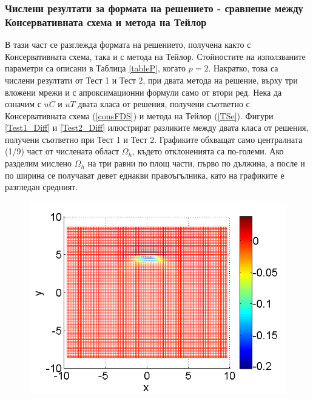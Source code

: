\documentclass[a4paper]{article}
\newcommand{\rf}[1]{(\ref{#1})}
\theoremstyle{remark}
\begin{document}
\begin{large}
\subsubsection{Числени резултати за формата на решението - сравнение между Консервативната схема и метода на Тейлор}
В тази част се разглежда формата на решението, получена както с Консервативната схема, така и с метода на Тейлор. Стойностите на използваните параметри са описани в Таблица \ref{tableP}, когато $p=2$. Накратко, това са числени резултати от Тест 1 и Тест 2, при двата метода на решение, върху три вложени мрежи и с апроксимационни формули само от втори ред. Нека да означим с $uC$ и $uT$ двата класа от решения, получени съответно с Консервативната схема \rf{consFDS} и метода на Тейлор \rf{TSe}. 
Фигури \ref{Test1_Diff} и \ref{Test2_Diff} илюстрират разликите между двата класа от решения, получени съответно при Тест 1 и Тест 2. Графиките обхващат само централната (1/9) част от числената област $\Omega_h$, където отклоненията са по-големи. Ако разделим мислено $\Omega_h$ на три равни по площ части, първо по дължина, а после и по ширина се получават девет еднакви правоъгълника, като на графиките е разгледан средният.
\begin{figure}[ht]\vspace{0.4cm}
	\begin{minipage}[b]{0.32\linewidth}
		 \includegraphics[width=\linewidth]{SolutionDiff/TaylorZeroBndVsEnergySave_30_ZB2_bt3_c045_h020_O(h^2).png}
	\end{minipage}	
	\begin{minipage}[b]{0.32\linewidth}

\end{minipage}
\end{figure}
\end{large}
\end{document}
